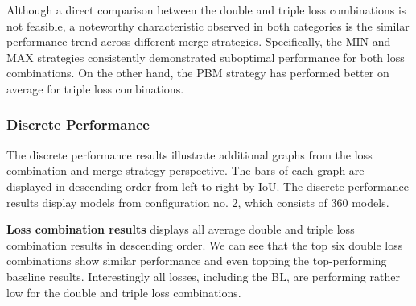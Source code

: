 Although a direct comparison between the double and triple loss combinations is not feasible, a noteworthy characteristic observed in both categories is the similar performance trend across different merge strategies. Specifically, the MIN and MAX strategies consistently demonstrated suboptimal performance for both loss combinations. On the other hand, the PBM strategy has performed better on average for triple loss combinations.
\subsubsection*{Discrete Performance}
The discrete performance results illustrate additional graphs from the loss combination and merge strategy perspective. The bars of each graph are displayed in descending order from left to right by \ac{IoU}. The discrete performance results display models from configuration no. 2, which consists of 360 models.

\textbf{Loss combination results}\newline
{} displays all average double and triple loss combination results in descending order. We can see that the top six double loss combinations show similar performance and even topping the top-performing baseline results. Interestingly all losses, including the \ac{BL}, are performing rather low for the double and triple loss combinations.


